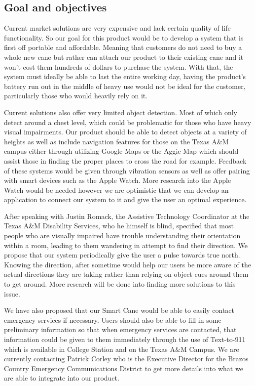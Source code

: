 \documentclass[letterpaper,12pt]{article}
\begin{document}
\subsection{Goal and objectives}

Current market solutions are very expensive and lack certain quality of life functionality. So our goal for this product would be to develop a system that is first off portable and affordable. Meaning that customers do not need to buy a whole new cane but rather can attach our product to their existing cane and it won’t cost them hundreds of dollars to purchase the system. With that, the system must ideally be able to last the entire working day, having the product’s battery run out in the middle of heavy use would not be ideal for the customer, particularly those who would heavily rely on it. \par

Current solutions also offer very limited object detection. Most of which only detect around a chest level, which could be problematic for those who have heavy visual impairments. Our product should be able to detect objects at a variety of heights as well as include navigation features for those on the Texas A\&M campus either through utilizing Google Maps or the Aggie Map which should assist those in finding the proper places to cross the road for example. Feedback of these systems would be given through vibration sensors as well as offer pairing with smart devices such as the Apple Watch. More research into the Apple Watch would be needed however we are optimistic that we can develop an application to connect our system to it and give the user an optimal experience. \par
After speaking with Justin Romack, the Assistive Technology Coordinator at the Texas A\&M Disability Services, who he himself is blind, specified that most people who are visually impaired have trouble understanding their orientation within a room, leading to them wandering in attempt to find their direction. We propose that our system periodically give the user a pulse towards true north. Knowing the direction, after sometime would help our users be more aware of the actual directions they are taking rather than relying on object cues around them to get around. More research will be done into finding more solutions to this issue. \par

We have also proposed that our Smart Cane would be able to easily contact emergency services if necessary. Users should also be able to fill in some preliminary information so that when emergency services are contacted, that information could be given to them immediately through the use of Text-to-911 which is available in College Station and on the Texas A\&M Campus. We are currently contacting Patrick Corley who is the Executive Director for the Brazos Country Emergency Communications District to get more details into what we are able to integrate into our product. \par
\end{document}

